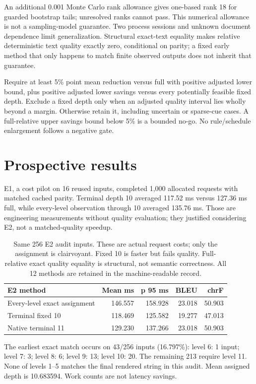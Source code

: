 \documentclass[11pt]{article}
\begin{document}
An additional 0.001 Monte Carlo rank allowance gives one-based rank 18 for guarded bootstrap tails; unresolved ranks cannot pass. This numerical allowance is not a sampling-model guarantee. Two process sessions and unknown document dependence limit generalization. Structural exact-text equality makes relative deterministic text quality exactly zero, conditional on parity; a fixed early method that only happens to match finite observed outputs does not inherit that guarantee.

Require at least 5\% point mean reduction versus full with positive adjusted lower bound, plus positive adjusted lower savings versus every potentially feasible fixed depth. Exclude a fixed depth only when an adjusted quality interval lies wholly beyond a margin. Otherwise retain it, including uncertain or sparse-cue cases. A full-relative upper savings bound below 5\% is a bounded no-go. No rule/schedule enlargement follows a negative gate.

\section{Prospective results}
E1, a cost pilot on 16 reused inputs, completed 1,000 allocated requests with matched cached parity. Terminal depth 10 averaged 117.52 ms versus 127.36 ms full, while every-level observation through 10 averaged 135.76 ms. Those are engineering measurements without quality evaluation; they justified considering E2, not a matched-quality speedup.

\begin{table}[ht]
\centering\small
\begin{tabular}{lrrrr}
\toprule
E2 method & Mean ms & p 95 ms & BLEU & chrF\\
\midrule
Every-level exact assignment &146.557&158.928&23.018&50.903\\
Terminal fixed 10 &118.469&125.582&19.277&47.013\\
Native terminal 11 &129.230&137.266&23.018&50.903\\
\bottomrule
\end{tabular}
\caption{Same 256 E2 audit inputs. These are actual request costs; only the assignment is clairvoyant. Fixed 10 is faster but fails quality. Full-relative exact quality equality is structural, not semantic correctness. All 12 methods are retained in the machine-readable record.}
\label{tab:e 2}
\end{table}

The earliest exact match occurs on 43/256 inputs (16.797\%): level 6: 1 input; level 7: 3; level 8: 6; level 9: 13; level 10: 20. The remaining 213 require level 11. None of levels 1--5 matches the final rendered string in this audit. Mean assigned depth is 10.683594. Work counts are not latency savings.
\end{document}
